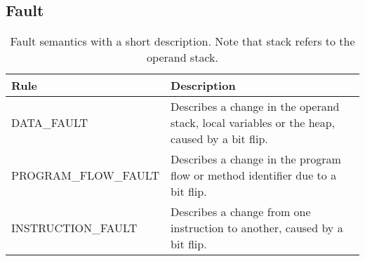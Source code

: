 \subsection{Fault}
\begin{table}[H]
\centering
\label{tab:fault}
\begin{tabular}{p{}|p{}}
\textbf{Rule} 					  & \textbf{Description} \\ \hline
DATA\_FAULT             		  & Describes a change in the operand stack, local variables or the heap, caused by a bit flip.\\ \hline 
PROGRAM\_FLOW\_FAULT			  & Describes a change in the program flow or method identifier due to a bit flip. \\ \hline
INSTRUCTION\_FAULT				  & Describes a change from one instruction to another, caused by a bit flip. \\ \hline
\end{tabular}
\caption{Fault semantics with a short description. Note that stack refers to the operand stack.}
\end{table}